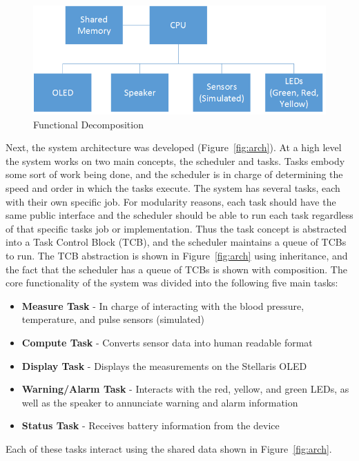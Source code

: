 \documentclass[12pt]{article} %
\begin{document}
\begin{figure}[h]
    \centering
    \includegraphics[width=\textwidth]{../design/Functional_decomposition}
    \caption{Functional Decomposition}
    \label{fig:func}
\end{figure}

Next, the system architecture was developed (Figure~\ref{fig:arch}).  At a high
level the system works on two main concepts, the scheduler and tasks.  Tasks
embody some sort of work being done, and the scheduler is in charge of
determining the speed and order in which the tasks execute.  The system has
several tasks, each with their own specific job.  For modularity reasons, each
task should have the same public interface and the scheduler should be able to
run each task regardless of that specific tasks job or implementation.  Thus
the task concept is abstracted into a Task Control Block (TCB), and the
scheduler maintains a queue of TCBs to run.  The TCB abstraction is shown in
Figure~\ref{fig:arch} using inheritance, and the fact that the scheduler has a
queue of TCBs is shown with composition.  The core functionality of the system
was divided into the following five main tasks:
\begin{itemize}
  \item \textbf{Measure Task} - In charge of interacting with the blood pressure, temperature, and pulse sensors (simulated)
  \item \textbf{Compute Task} - Converts sensor data into human readable format
  \item \textbf{Display Task} - Displays the measurements on the Stellaris OLED
  \item \textbf{Warning/Alarm Task} - Interacts with the red, yellow, and green LEDs, as well as the speaker to annunciate warning and alarm information
  \item \textbf{Status Task} - Receives battery information from the device
\end{itemize}
Each of these tasks interact using the shared data shown in Figure~\ref{fig:arch}. 
\end{document}
